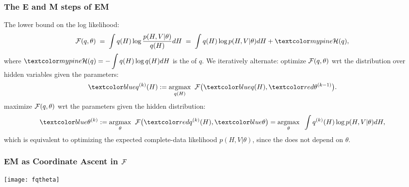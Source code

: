 \begin{frame}
\frametitle{The E and M steps of EM}

The lower bound on the log likelihood:
%
\begin{equation}
{\cal F}(q,\theta)\;=\;\int q(H)\log\frac{p(H,V|\theta)}{q(H)}dH\;=\;
\int q(H)\log p(H,V|\theta)dH+\Green{{\cal H}(q)},
\end{equation}
%
where $\Green{{\cal H}(q)=-\displaystyle\int q(H)\log q(H)dH}$ is the
 of $q$. We iteratively alternate:
%
 optimize ${\cal F}(q,\theta)$ wrt the distribution over hidden
variables given the parameters:
\begin{equation}
\Blue{q^{(k)}(H)}:=\underset{q(H)}{\argmax}\;\;{\cal F}\big(\Blue{q(H)},\Red{\theta^{(k-1)}}\big).
\end{equation}
 maximize ${\cal F}(q,\theta)$ wrt the parameters given
the hidden distribution:
\begin{equation}
\Blue{\theta^{(k)}}:=\underset{\theta}{\argmax}\;\;
{\cal F}\big(\Red{q^{(k)}(H)},\Blue{\theta}\big)=
\underset{\theta}{\argmax}\;\;\int q^{(k)}(H)\log p(H,V|\theta)dH,
\end{equation}
which is equivalent to optimizing the expected complete-data likelihood
$p(H,V|\theta)$, since the  does not depend on
$\theta$.
\end{frame}

\begin{frame}
\frametitle{EM as Coordinate Ascent in ${\cal F}$}

\centerline{\texttt{[image: fqtheta]}}
\end{frame}

